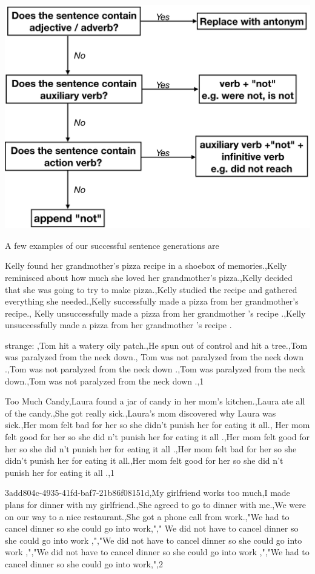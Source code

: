 \documentclass{article}
\begin{document}
\includegraphics[width=0.9 \linewidth]{wrong.PNG}


A few examples of our successful sentence generations are



Kelly found her grandmother's pizza recipe in a shoebox of memories.,Kelly reminisced about how much she loved her grandmother's pizza.,Kelly decided that she was going to try to make pizza.,Kelly studied the recipe and gathered everything she needed.,Kelly successfully made a pizza from her grandmother's recipe., Kelly unsuccessfully made a pizza from her grandmother 's recipe .,Kelly unsuccessfully made a pizza from her grandmother 's recipe .




strange: ,Tom hit a watery oily patch.,He spun out of control and hit a tree.,Tom was paralyzed from the neck down., Tom was not paralyzed from the neck down .,Tom was not paralyzed from the neck down .,Tom was paralyzed from the neck down.,Tom was not paralyzed from the neck down .,1

Too Much Candy,Laura found a jar of candy in her mom's kitchen.,Laura ate all of the candy.,She got really sick.,Laura's mom discovered why Laura was sick.,Her mom felt bad for her so she didn't punish her for eating it all., Her mom felt good for her so she did n't punish her for eating it all .,Her mom felt good for her so she did n't punish her for eating it all .,Her mom felt bad for her so she didn't punish her for eating it all.,Her mom felt good for her so she did n't punish her for eating it all .,1

3add804c-4935-41fd-baf7-21b86f08151d,My girlfriend works too much,I made plans for dinner with my girlfriend.,She agreed to go to dinner with me.,We were on our way to a nice restaurant.,She got a phone call from work.,"We had to cancel dinner so she could go into work,"," We did not have to cancel dinner so she could go into work ,","We did not have to cancel dinner so she could go into work ,","We did not have to cancel dinner so she could go into work ,","We had to cancel dinner so she could go into work,",2
\end{document}
